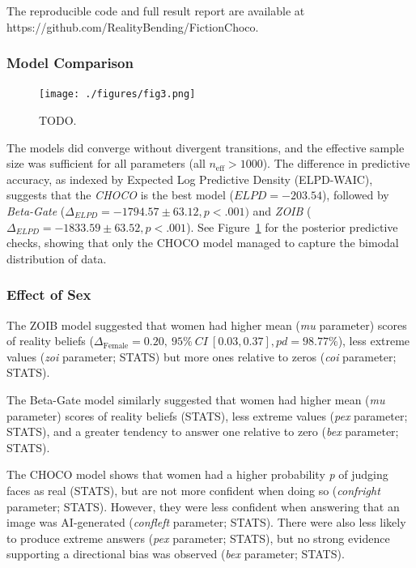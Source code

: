 \documentclass[
  jou,
  floatsintext,
  longtable,
  nolmodern,
  notxfonts,
  notimes,
  colorlinks=true,linkcolor=blue,citecolor=blue,urlcolor=blue]{apa7}
\begin{document}
The reproducible code and full result report are available at
https://github.com/RealityBending/FictionChoco.

\subsubsection{Model Comparison}\label{model-comparison}

\begin{figure}[!htbp]

{\caption{{TODO.}{\label{fig-three}}}}

\texttt{[image: ./figures/fig3.png]}

\end{figure}

The models did converge without divergent transitions, and the effective
sample size was sufficient for all parameters (all
\(n_{\text{eff}} > 1000\)). The difference in predictive accuracy, as
indexed by Expected Log Predictive Density (ELPD-WAIC), suggests that
the \emph{CHOCO} is the best model (\(ELPD = -203.54\)), followed by
\emph{Beta-Gate} (\(\Delta_{ELPD} = -1794.57 \pm 63.12, p < .001)\) and
\emph{ZOIB} (\(\Delta_{ELPD} = -1833.59 \pm 63.52, p < .001\)). See
Figure~\ref{fig-three} for the posterior predictive checks, showing that
only the CHOCO model managed to capture the bimodal distribution of
data.

\subsubsection{Effect of Sex}\label{effect-of-sex}

The ZOIB model suggested that women had higher mean (\emph{mu}
parameter) scores of reality beliefs
(\(\Delta_{\text{Female}} = 0.20,~95\%~ CI~[0.03, 0.37], pd = 98.77\%\)),
less extreme values (\emph{zoi} parameter; STATS) but more ones relative
to zeros (\emph{coi} parameter; STATS).

The Beta-Gate model similarly suggested that women had higher mean
(\emph{mu} parameter) scores of reality beliefs (STATS), less extreme
values (\emph{pex} parameter; STATS), and a greater tendency to answer
one relative to zero (\emph{bex} parameter; STATS).

The CHOCO model shows that women had a higher probability \emph{p} of
judging faces as real (STATS), but are not more confident when doing so
(\emph{confright} parameter; STATS). However, they were less confident
when answering that an image was AI-generated (\emph{confleft}
parameter; STATS). There were also less likely to produce extreme
answers (\emph{pex} parameter; STATS), but no strong evidence supporting
a directional bias was observed (\emph{bex} parameter; STATS).
\end{document}
